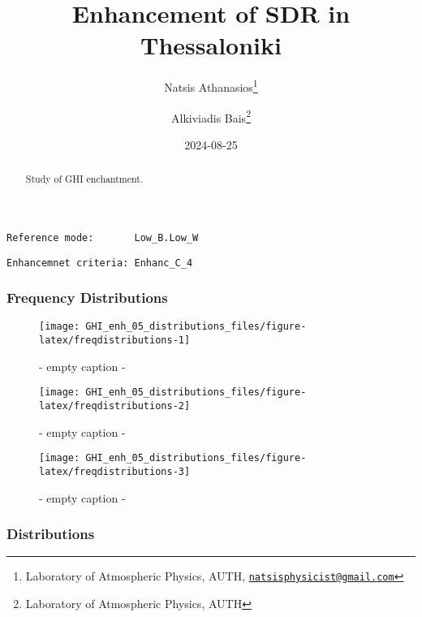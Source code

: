 \documentclass[
  10pt,
  a4paper,oneside]{article}
\title{Enhancement of SDR in Thessaloniki}
\author{Natsis Athanasios\footnote{Laboratory of Atmospheric Physics, AUTH, \href{mailto:natsisphysicist@gmail.com}{\nolinkurl{natsisphysicist@gmail.com}}} \and Alkiviadis Bais\footnote{Laboratory of Atmospheric Physics, AUTH}}
\date{2024-08-25}
\begin{document}
\maketitle
\begin{abstract}
Study of GHI enchantment.
\end{abstract}

{
\hypersetup{linkcolor=}
\setcounter{tocdepth}{4}
\tableofcontents
}
\begin{verbatim}
Reference mode:       Low_B.Low_W 
\end{verbatim}

\begin{verbatim}
Enhancemnet criteria: Enhanc_C_4 
\end{verbatim}

\FloatBarrier

\hypertarget{frequency-distributions}{%
\subsubsection{Frequency Distributions}\label{frequency-distributions}}

\begin{figure}[H]

{\centering \texttt{[image: GHI\_enh\_05\_distributions\_files/figure-latex/freqdistributions-1]} 

}

\caption{ - empty caption - }\label{fig:freqdistributions-1}
\end{figure}
\begin{figure}[H]

{\centering \texttt{[image: GHI\_enh\_05\_distributions\_files/figure-latex/freqdistributions-2]} 

}

\caption{ - empty caption - }\label{fig:freqdistributions-2}
\end{figure}
\begin{figure}[H]

{\centering \texttt{[image: GHI\_enh\_05\_distributions\_files/figure-latex/freqdistributions-3]} 

}

\caption{ - empty caption - }\label{fig:freqdistributions-3}
\end{figure}

\FloatBarrier

\hypertarget{distributions}{%
\subsubsection{Distributions}\label{distributions}}
\end{document}
